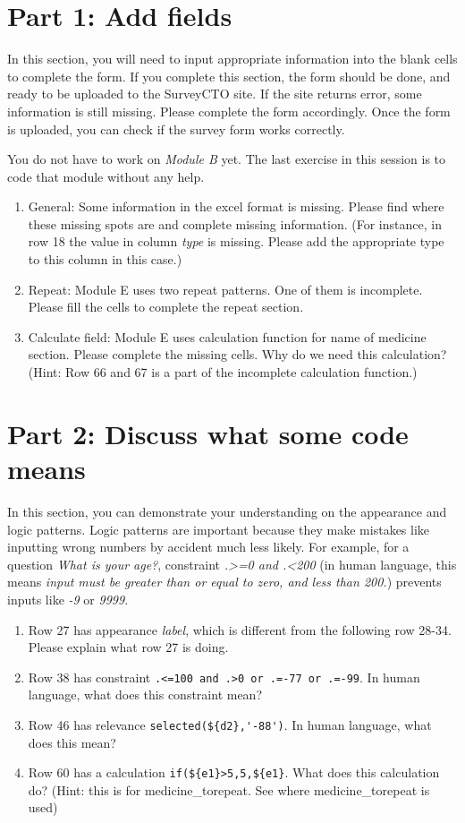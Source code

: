 \documentclass{tufte-handout}
\begin{document}
\section{Part 1: Add fields}
In this section, you will need to input appropriate information into the blank cells to complete the form. If you complete this section, the form should be done, and ready to be uploaded to the SurveyCTO site. If the site returns error, some information is still missing. Please complete the form accordingly. Once the form is uploaded, you can check if the survey form works correctly. 

You do not have to work on \textit{Module B} yet. The last exercise in this session is to code that module without any help.

\begin{enumerate}
	\item General: Some information in the excel format is missing. Please find where these missing spots are and complete missing information. (For instance, in row 18 the value in column \textit{type} is missing. Please add the appropriate type to this column in this case.) 
	\item Repeat: Module E uses two repeat patterns. One of them is incomplete. Please fill the cells to complete the repeat section.
	\item Calculate field: Module E uses calculation function for name of medicine section. Please complete the missing cells. Why do we need this calculation? (Hint: Row 66 and 67 is a part of the incomplete calculation function.)
\end{enumerate}

\section{Part 2: Discuss what some code means}
In this section, you can demonstrate your understanding on the appearance and logic patterns. Logic patterns are important because they make mistakes like inputting wrong numbers by accident much less likely. For example, for a question \textit{What is your age?}, constraint \textit{.>=0 and .<200} (in human language, this means \textit{input must be greater than or equal to zero, and less than 200.}) prevents inputs like \textit{-9} or \textit{9999}. 

\begin{enumerate}
	\item Row 27 has appearance \textit{label}, which is different from the following row 28-34. Please explain what row 27 is doing.
	\item Row 38 has constraint \verb|.<=100 and .>0 or .=-77 or .=-99|. In human language, what does this constraint mean?
	\item Row 46 has relevance  \verb|selected(${d2},'-88')|. In human language, what does this mean? 
	\item Row 60 has a calculation  \verb|if(${e1}>5,5,${e1}|. What does this calculation do? (Hint: this is for medicine\_torepeat. See where medicine\_torepeat is used)
\end{enumerate}
\end{document}
